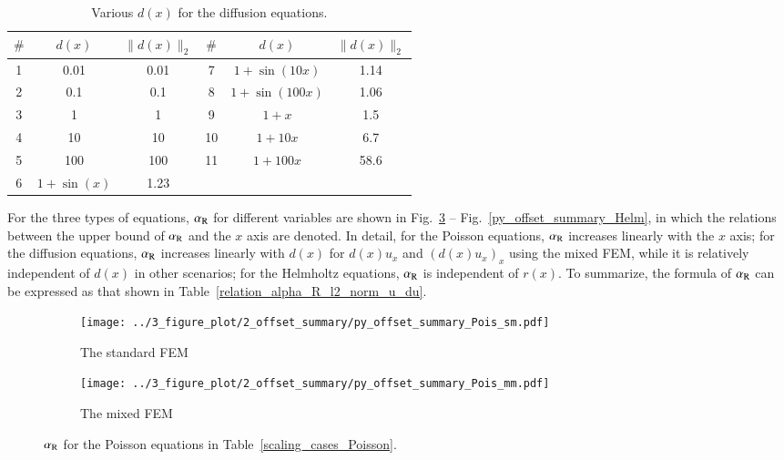 \documentclass[review,3p]{elsarticle}
\begin{document}
\begin{table}[!ht]
\centering
\caption [w]{Various $d(x)$ for the diffusion equations.} 
\label{d_diffusion_equations}
 \begin{tabular}{c c c c c c} \hline
$\#$ &$d(x)$ & $\|d(x)\|_2$ & $\#$ &$d(x)$ & $\|d(x)\|_2$ \\ \hline
1 & 0.01 & 0.01 & 7 & $1+\sin(10x)$ & 1.14 \\ \hline
2 & 0.1 & 0.1 & 8 & $1+\sin(100x)$ & 1.06 \\ \hline
3 & 1 & 1 & 9 & $1+x$ & 1.5 \\ \hline
4 & 10 & 10 & 10 & $1+10x$ & 6.7 \\ \hline
5 & 100 & 100 & 11& $1+100x$ & 58.6 \\ \hline
6 & $1+\sin(x)$ & 1.23 & & &  \\ \hline
\end{tabular}
\end{table}

\newpage

For the three types of equations, $\alpha_{\rm R}$ for different variables are shown in Fig.~\ref{py_offset_summary_Pois} -- Fig.~\ref{py_offset_summary_Helm}, in which the relations between the upper bound of $\alpha_{\rm R}$ and the $x$ axis are denoted.
In detail, for the Poisson equations, $\alpha_{\rm R}$ increases linearly with the $x$ axis; for the diffusion equations, $\alpha_{\rm R}$ increases linearly with $d(x)$ for $d(x)u_x$ and $(d(x)u_x)_x$ using the mixed FEM, while it is relatively independent of $d(x)$ in other scenarios; for the Helmholtz equations, $\alpha_{\rm R}$ is independent of $r(x)$.
To summarize, the formula of $\alpha_{\rm R}$ can be expressed as that shown in Table~\ref{relation_alpha_R_l2_norm_u_du}.

\begin{figure}[!ht]
	\hspace{2.5cm}
    \begin{subfigure}{5.4cm}
        \texttt{[image: ../3\_figure\_plot/2\_offset\_summary/py\_offset\_summary\_Pois\_sm.pdf]}
        \caption{The standard FEM}
        \label{py_offset_summary_Pois_sm}
    \end{subfigure}
    \hspace{-0.2cm}
    \begin{subfigure}{5.4cm}
        \texttt{[image: ../3\_figure\_plot/2\_offset\_summary/py\_offset\_summary\_Pois\_mm.pdf]}
        \caption{The mixed FEM}
        \label{py_offset_summary_Pois_mm}
    \end{subfigure}
\caption{$\alpha_{\rm R}$ for the Poisson equations in Table~\ref{scaling_cases_Poisson}.}
\label{py_offset_summary_Pois}
\end{figure}
\end{document}
